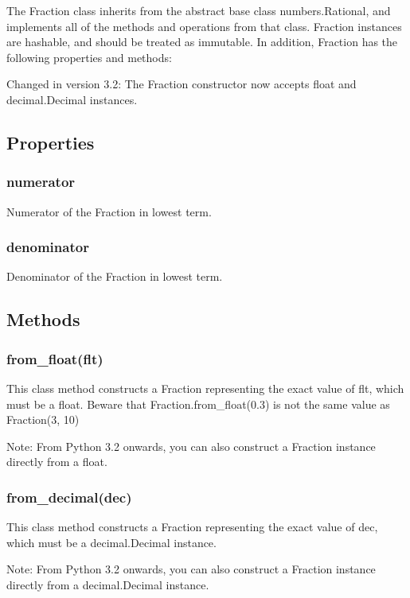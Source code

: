 The Fraction class inherits from the abstract base class numbers.Rational, and implements all of the methods and operations from that class. Fraction instances are hashable, and should be treated as immutable. In addition, Fraction has the following properties and methods:


Changed in version 3.2: The Fraction constructor now accepts float and decimal.Decimal instances.

\subsection{Properties}

\subsubsection{numerator}

Numerator of the Fraction in lowest term.

\subsubsection{denominator}

Denominator of the Fraction in lowest term.

\subsection{Methods}

\subsubsection{from\_float(flt)}

This class method constructs a Fraction representing the exact value of flt, which must be a float. Beware that Fraction.from\_float(0.3) is not the same value as Fraction(3, 10)

Note:
From Python 3.2 onwards, you can also construct a Fraction instance directly from a float.


\subsubsection{from\_decimal(dec)}

This class method constructs a Fraction representing the exact value of dec, which must be a decimal.Decimal instance.

Note:
From Python 3.2 onwards, you can also construct a Fraction instance directly from a decimal.Decimal instance.

